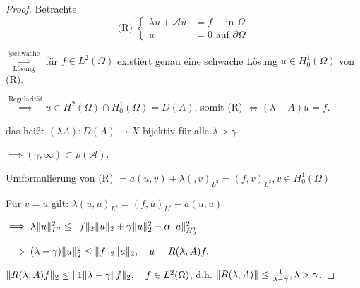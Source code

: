 \begin{proof}
Betrachte
$$
\text{(R) } \begin{cases} \lambda u + \mathcal{A} u &= f \quad\text{ in } \Omega \\ u &= 0 \text{ auf } \partial \Omega \end{cases}
$$

$\overset{§ \text{schwache}}{\underset{\text{Lösung}}{\implies}}$  für $f \in L^2(\Omega)$ existiert genau eine schwache Lösung $u \in H_0^1(\Omega)$ von (R).

$\overset{\text{Regularität}}{\implies} u \in H^2(\Omega) \cap H_0^1(\Omega) = D(A)$, somit (R) $\iff (\lambda - A) u = f$.

das heißt $(\lambda A) \colon D(A) \to X$ bijektiv für alle $\lambda > \gamma$

$\implies (\gamma, \infty) \subset \rho(\mathcal{A})$.

Umformulierung von (R) $= a(u,v) + \lambda (,v)_{L^2} = (f, v)_{L^2}, v \in H_0^1(\Omega)$

Für $v = u$ gilt: $\lambda(u,u)_{L^2} = (f, u)_{L^2} - a(u,u)$

$\implies \lambda \lVert u \rVert_{L^2}^2 \leq \lVert f \rVert_2 \lVert u \rVert_2 + \gamma \lVert u \rVert_2^2 - \alpha \lVert u \rVert_{H_0^1}^2$

$\implies (\lambda - \gamma) \lVert u \rVert_2^2 \leq \lVert f \rVert_2 \lVert u \rVert_2, \quad u = R(\lambda, A) f,$

$\lVert R(\lambda, A) f \rVert_2 \leq \lVert 1 \rVert{\lambda - \gamma } \lVert f \rVert_2, \quad f \in L^2(\Omega)$, d.h. $\lVert R(\lambda, A) \rVert \leq \frac{1}{\lambda - \gamma}, \lambda > \gamma$.
\end{proof}

